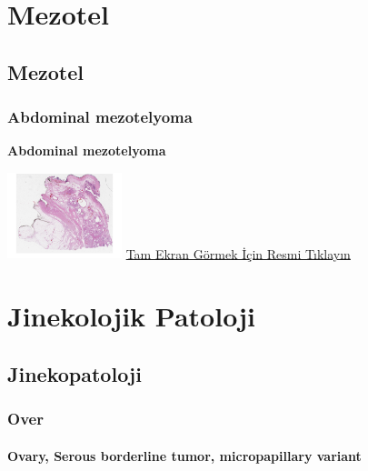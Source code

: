 \documentclass[
  letterpaper,
  DIV=11,
  numbers=noendperiod]{scrreprt}
\begin{document}
\part{Mezotel}

\hypertarget{sec-mezotel}{%
\chapter{Mezotel}\label{sec-mezotel}}

\hypertarget{sec-abdominal-mesothelioma}{%
\section{Abdominal mezotelyoma}\label{sec-abdominal-mesothelioma}}

\textbf{Abdominal mezotelyoma}

\href{https://images.patolojiatlasi.com/abdominal-mesothelioma/HE.html}{\includegraphics[width=0.25\textwidth,height=\textheight]{./screenshots/abdominal-mesothelioma_screenshot.png}}
\href{https://images.patolojiatlasi.com/abdominal-mesothelioma/HE.html}{Tam
Ekran Görmek İçin Resmi Tıklayın}

\part{Jinekolojik Patoloji}

\hypertarget{sec-jinekopatoloji}{%
\chapter{Jinekopatoloji}\label{sec-jinekopatoloji}}

\hypertarget{sec-over}{%
\section{Over}\label{sec-over}}

\hypertarget{sec-ovary-serous-borderline-micropapillary}{%
\subsection{Ovary, Serous borderline tumor, micropapillary
variant}\label{sec-ovary-serous-borderline-micropapillary}}
\end{document}
